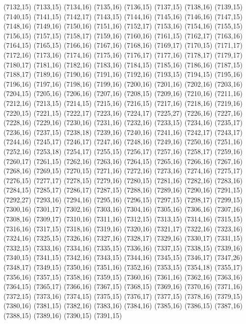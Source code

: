(7132,15)
(7133,15)
(7134,16)
(7135,16)
(7136,15)
(7137,15)
(7138,16)
(7139,15)
(7140,15)
(7141,15)
(7142,17)
(7143,15)
(7144,16)
(7145,16)
(7146,16)
(7147,15)
(7148,16)
(7149,16)
(7150,16)
(7151,16)
(7152,17)
(7153,16)
(7154,16)
(7155,15)
(7156,15)
(7157,15)
(7158,17)
(7159,16)
(7160,16)
(7161,15)
(7162,17)
(7163,16)
(7164,15)
(7165,15)
(7166,16)
(7167,16)
(7168,16)
(7169,17)
(7170,15)
(7171,17)
(7172,16)
(7173,16)
(7174,16)
(7175,16)
(7176,17)
(7177,16)
(7178,17)
(7179,17)
(7180,17)
(7181,16)
(7182,16)
(7183,16)
(7184,15)
(7185,16)
(7186,16)
(7187,15)
(7188,17)
(7189,16)
(7190,16)
(7191,16)
(7192,16)
(7193,15)
(7194,15)
(7195,16)
(7196,16)
(7197,16)
(7198,16)
(7199,16)
(7200,16)
(7201,16)
(7202,16)
(7203,16)
(7204,15)
(7205,16)
(7206,16)
(7207,16)
(7208,15)
(7209,16)
(7210,16)
(7211,16)
(7212,16)
(7213,15)
(7214,15)
(7215,16)
(7216,15)
(7217,16)
(7218,16)
(7219,16)
(7220,15)
(7221,15)
(7222,17)
(7223,16)
(7224,17)
(7225,27)
(7226,16)
(7227,16)
(7228,16)
(7229,16)
(7230,16)
(7231,16)
(7232,16)
(7233,15)
(7234,16)
(7235,17)
(7236,16)
(7237,15)
(7238,18)
(7239,16)
(7240,16)
(7241,16)
(7242,17)
(7243,17)
(7244,16)
(7245,17)
(7246,17)
(7247,16)
(7248,16)
(7249,16)
(7250,16)
(7251,16)
(7252,16)
(7253,18)
(7254,17)
(7255,15)
(7256,17)
(7257,16)
(7258,17)
(7259,16)
(7260,17)
(7261,15)
(7262,16)
(7263,16)
(7264,15)
(7265,16)
(7266,16)
(7267,16)
(7268,16)
(7269,15)
(7270,15)
(7271,16)
(7272,16)
(7273,16)
(7274,16)
(7275,17)
(7276,15)
(7277,17)
(7278,15)
(7279,16)
(7280,15)
(7281,16)
(7282,16)
(7283,16)
(7284,15)
(7285,17)
(7286,17)
(7287,15)
(7288,16)
(7289,16)
(7290,16)
(7291,15)
(7292,27)
(7293,16)
(7294,16)
(7295,16)
(7296,15)
(7297,15)
(7298,17)
(7299,15)
(7300,16)
(7301,17)
(7302,16)
(7303,16)
(7304,16)
(7305,16)
(7306,16)
(7307,16)
(7308,16)
(7309,17)
(7310,16)
(7311,16)
(7312,15)
(7313,15)
(7314,16)
(7315,15)
(7316,16)
(7317,15)
(7318,16)
(7319,16)
(7320,16)
(7321,17)
(7322,16)
(7323,16)
(7324,16)
(7325,15)
(7326,16)
(7327,16)
(7328,17)
(7329,16)
(7330,17)
(7331,15)
(7332,15)
(7333,16)
(7334,16)
(7335,15)
(7336,16)
(7337,15)
(7338,15)
(7339,16)
(7340,15)
(7341,15)
(7342,16)
(7343,15)
(7344,16)
(7345,15)
(7346,17)
(7347,26)
(7348,17)
(7349,15)
(7350,16)
(7351,16)
(7352,16)
(7353,15)
(7354,18)
(7355,17)
(7356,16)
(7357,15)
(7358,16)
(7359,15)
(7360,16)
(7361,16)
(7362,16)
(7363,16)
(7364,15)
(7365,17)
(7366,16)
(7367,15)
(7368,15)
(7369,16)
(7370,16)
(7371,16)
(7372,15)
(7373,16)
(7374,15)
(7375,15)
(7376,17)
(7377,15)
(7378,16)
(7379,15)
(7380,16)
(7381,15)
(7382,16)
(7383,16)
(7384,16)
(7385,16)
(7386,15)
(7387,16)
(7388,15)
(7389,16)
(7390,15)
(7391,15)
